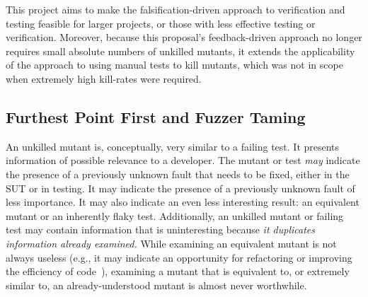 This project aims to make the falsification-driven approach to verification and testing feasible for larger
projects, or those with less effective testing or verification.
Moreover, because this proposal's feedback-driven approach no longer requires small absolute numbers of
unkilled mutants, it extends the applicability of the approach
to using manual tests to kill mutants, which was not in
scope when extremely high kill-rates were required.

\subsection{Furthest Point First and Fuzzer Taming}

An unkilled mutant is, conceptually, very similar to a failing test.
It presents information of possible relevance to a developer.  The mutant or test \emph{may} indicate the presence of a
previously unknown fault that needs to be fixed, either in the SUT or in testing.  It may indicate the presence of a previously unknown fault
of less importance.  It may also indicate an even less interesting
result:  an equivalent mutant or 
an inherently flaky test.  Additionally, an unkilled
mutant or failing test may contain information that is uninteresting because \emph{it
  duplicates information already examined.}  While
examining an equivalent mutant is not always useless (e.g., it may indicate
an opportunity for refactoring or improving the efficiency of code~\cite{ivankovic2018industrial,groce2018verified}), examining a mutant that is
equivalent to, or extremely similar to, an already-understood mutant is almost never
worthwhile.  %

